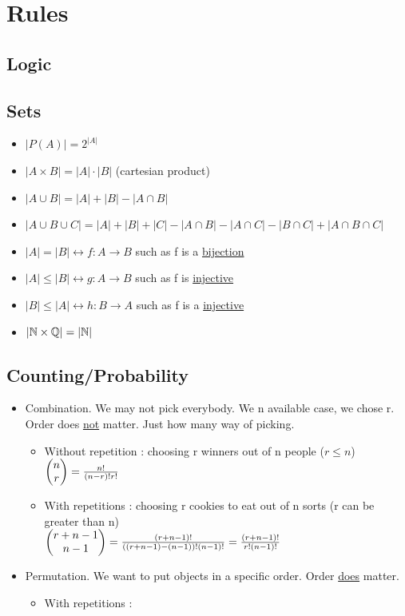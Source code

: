 \documentclass[12pt,a4paper]{article}
\begin{document}
\section{Rules}
\subsection{Logic}
\subsection{Sets}
\begin{itemize}
	\item $|P(A)| = 2^{|A|}$
	\item $|A \times B| = |A| \cdot |B|$ (cartesian product)
	\item $|A \cup B| = |A| + |B| - |A \cap B|$
	\item $|A \cup B \cup C| = |A| + |B| +  |C| - |A \cap B| - |A \cap C| - |B \cap C| + |A \cap B \cap C|$ 
	\item $|A| = |B| \leftrightarrow f: A \rightarrow B$ such as f is a \underline{bijection}
	\item $|A| \leq |B| \leftrightarrow g: A \rightarrow B$ such as f is \underline{injective}
	\item $|B| \leq |A| \leftrightarrow h: B \rightarrow A$ such as f is a \underline{injective}
	\item $|\mathbb{N} \times \mathbb{Q}| = |\mathbb{N}|$
\end{itemize}

\subsection{Counting/Probability}
\begin{itemize}
	\item Combination. We may not pick everybody. We n available case, we chose r.	Order does \underline{not} matter. Just how many way of picking.
		\begin{itemize}
			\item Without repetition : choosing r winners out of n people ($r \leq n$)\\
			 $\begin{pmatrix} n \\ r \end{pmatrix} = \frac{n!}{(n-r)!r!}$
			 \item With repetitions : choosing r cookies to eat out of n sorts (r can be greater than n)\\
			 $\begin{pmatrix} r+n-1 \\ n-1 \end{pmatrix} =\frac{(r+n-1)!}{((r+n-1)-(n-1))!(n-1)!} = \frac{(r+n-1)!}{r!(n-1)!}$
		\end{itemize}
	\item Permutation. We want to put objects in a specific order. Order \underline{does} matter.
		\begin{itemize}
			\item With repetitions :
		\end{itemize}
\end{itemize}
\end{document}
